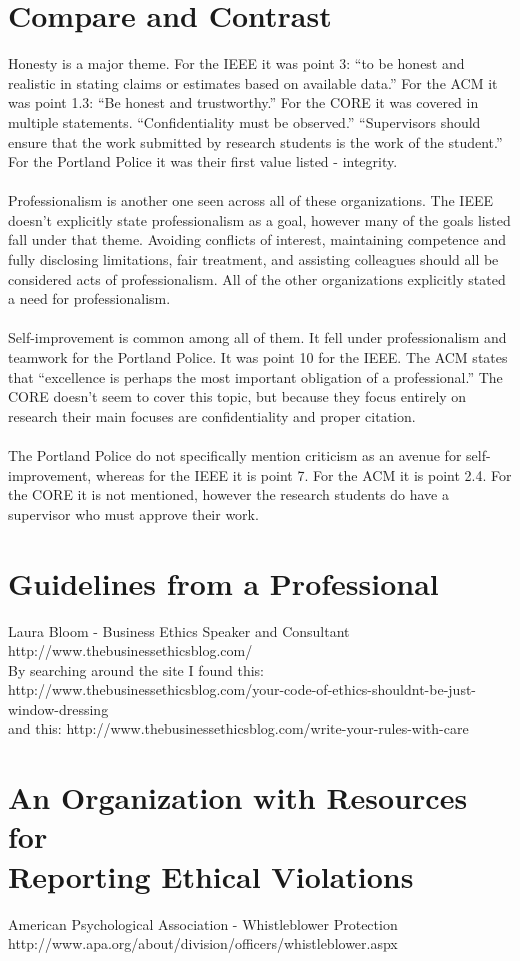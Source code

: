\documentclass{article}
\begin{document}
\section{Compare and Contrast}
Honesty is a major theme. 
For the IEEE it was point 3: ``to be honest and realistic in stating claims or estimates based on available data.''
For the ACM it was point 1.3: ``Be honest and trustworthy.''
For the CORE it was covered in multiple statements. ``Confidentiality must be observed.'' 
``Supervisors should ensure that the work submitted by research students is the work of the student.''
For the Portland Police it was their first value listed - integrity.\\
\\
Professionalism is another one seen across all of these organizations.
The IEEE doesn't explicitly state professionalism as a goal, however many of the goals listed fall under that theme.
Avoiding conflicts of interest, maintaining competence and fully disclosing limitations, fair treatment, and assisting colleagues
should all be considered acts of professionalism. All of the other organizations explicitly stated a need for professionalism.\\
\\
Self-improvement is common among all of them. It fell under professionalism and teamwork for the Portland Police.
It was point 10 for the IEEE. The ACM states that ``excellence is perhaps the most important obligation of a professional.''
The CORE doesn't seem to cover this topic, but because they focus entirely on research their main focuses are confidentiality and proper citation.\\
\\
The Portland Police do not specifically mention criticism as an avenue for self-improvement, whereas for the IEEE it is point 7.
For the ACM it is point 2.4. For the CORE it is not mentioned, however the research students do have a supervisor who must approve their work.

\pagebreak

\section{Guidelines from a Professional}
Laura Bloom - Business Ethics Speaker and Consultant\\ 
http://www.thebusinessethicsblog.com/\\
By searching around the site I found this: http://www.thebusinessethicsblog.com/your-code-of-ethics-shouldnt-be-just-window-dressing\\
and this: http://www.thebusinessethicsblog.com/write-your-rules-with-care\\

\section{An Organization with Resources for\\
Reporting Ethical Violations}
American Psychological Association - Whistleblower Protection\\
http://www.apa.org/about/division/officers/whistleblower.aspx
\end{document}
